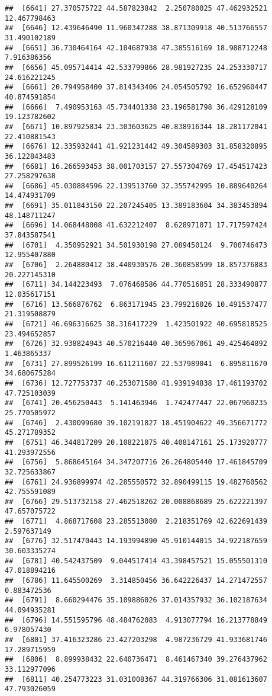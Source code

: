 \documentclass[
]{article}
\begin{document}
\begin{verbatim}
##  [6641] 27.370575722 44.587823842  2.250780025 47.462932521 12.467798463
##  [6646] 12.439646490 11.960347288 38.871309918 40.513766557 31.490102189
##  [6651] 36.730464164 42.104687938 47.385516169 18.988712248  7.916386356
##  [6656] 45.095714414 42.533799866 28.981927235 24.253330717 24.616221245
##  [6661] 20.794958400 37.814343406 24.054505792 16.652960447 40.874591854
##  [6666]  7.490953163 45.734401338 23.196581798 36.429128109 19.123782602
##  [6671] 10.897925834 23.303603625 40.838916344 18.281172041 22.410881543
##  [6676] 12.335932441 41.921231442 49.304589303 31.858320895 36.122843483
##  [6681] 16.266593453 38.001703157 27.557304769 17.454517423 27.258297638
##  [6686] 45.030884596 22.139513760 32.355742995 10.889640264 14.474931709
##  [6691] 35.011843150 22.207245405 13.389183604 34.383453894 48.148711247
##  [6696] 14.068448008 41.632212407  8.628971071 17.717597424 37.843587541
##  [6701]  4.350952921 34.501930198 27.089450124  9.700746473 12.955407880
##  [6706]  2.264880412 38.440930576 20.360858599 18.857376883 20.227145310
##  [6711] 34.144223493  7.076468586 44.770516851 28.333490877 12.035617151
##  [6716] 13.566876762  6.863171945 23.799216026 10.491537477 21.319508879
##  [6721] 46.696316625 38.316417229  1.423501922 40.695818525 23.494652857
##  [6726] 32.938824943 40.570216440 40.365967061 49.425464892  1.463865337
##  [6731] 27.899526199 16.611211607 22.537989041  6.895811670 34.680675284
##  [6736] 12.727753737 40.253071580 41.939194838 17.461193702 47.725103039
##  [6741] 20.456250443  5.141463946  1.742477447 22.067960235 25.770505972
##  [6746]  2.430099680 39.102191827 18.451904622 49.356671772 45.271789352
##  [6751] 46.344817209 20.108221075 40.408147161 25.173920777 41.293972556
##  [6756]  5.868645164 34.347207716 26.264805440 17.461845709 32.725633867
##  [6761] 24.936899974 42.285550572 32.890499115 19.482760562 42.755591089
##  [6766] 29.513732158 27.462518262 20.008868689 25.622221397 47.657075722
##  [6771]  4.868717608 23.285513080  2.218351769 42.622691439  2.597637149
##  [6776] 32.517470443 14.193994890 45.910144015 34.922187659 30.603335274
##  [6781] 40.542437509  9.044517414 43.398457521 15.055501310 47.018894216
##  [6786] 11.645500269  3.314850456 36.642226437 14.271472557  0.883472536
##  [6791]  8.660294476 35.109886026 37.014357932 36.102187634 44.094935281
##  [6796] 14.551595796 48.484762083  4.913077794 16.213778849  6.978057430
##  [6801] 37.416323286 23.427203298  4.987236729 41.933681746 17.289715959
##  [6806]  8.899938432 22.640736471  8.461467340 39.276437962 33.112977096
##  [6811] 40.254773223 31.031008367 44.319766306 31.081613607 47.793026059

\end{verbatim}
\end{document}
